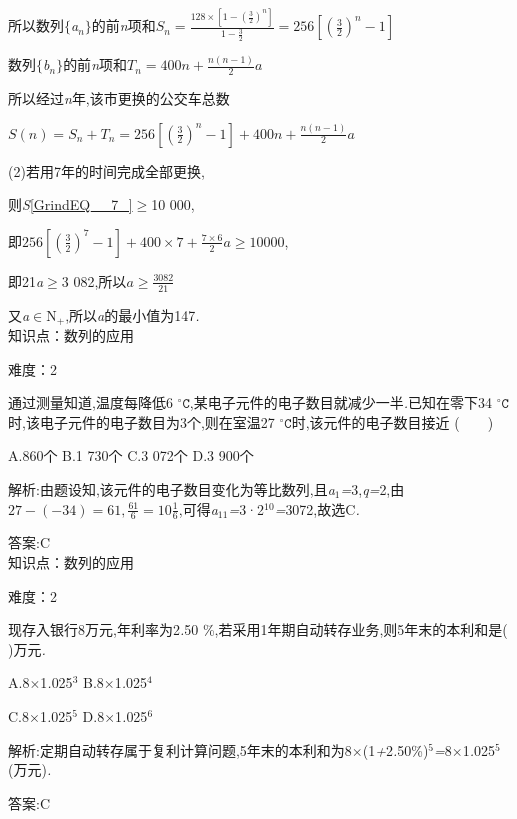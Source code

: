 \documentclass{article} %
\begin{document}
所以数列$\mathrm{\{}$\textit{a${}_{n}$}$\mathrm{\}}$的前\textit{n}项和$S_n=\frac{128\times [1-(\frac{3}{2})^n]}{1-\frac{3}{2}}=256[(\frac{3}{2})^n-1]$

数列$\mathrm{\{}$\textit{b${}_{n}$}$\mathrm{\}}$的前\textit{n}项和$T_n=400n+\frac{n(n-1)}{2}a$

所以经过\textit{n}年,该市更换的公交车总数

$S(n)=S_n+T_n=256[(\frac{3}{2})^n-1]+400n+\frac{n(n-1)}{2}a$

(2)若用7年的时间完成全部更换,

则\textit{S}\eqref{GrindEQ__7_}$\mathrm{\ge}$10 000,

即$256[(\frac{3}{2})^7-1]+400\times 7+\frac{7\times 6}{2}a\ge 10000$,

即21\textit{a}$\mathrm{\ge}$3 082,所以$a\ge \frac{3082}{21}$

又\textit{a}$\mathrm{\in}$N\textit{${}_{+}$},所以\textit{a}的最小值为147\textit{.} \\

知识点：数列的应用

难度：2

 通过测量知道,温度每降低6 $\mathtt{{}^\circ\!{C}}$,某电子元件的电子数目就减少一半\textit{.}已知在零下34 $\mathtt{{}^\circ\!{C}}$时,该电子元件的电子数目为3个,则在室温27 $\mathtt{{}^\circ\!{C}}$时,该元件的电子数目接近 (\textit{　　})

 A.860个 B.1 730个 C.3 072个 D.3 900个

 解析:由题设知,该元件的电子数目变化为等比数列,且\textit{a}${}_{1}$\textit{=}3,\textit{q=}2,由$27-(-34)=61,\frac{61}{6}=10\frac{1}{6}$,可得\textit{a}${}_{11}$\textit{=}3·2${}^{10}$\textit{=}3072,故选C\textit{.}

 答案:C \\

知识点：数列的应用

难度：2

 现存入银行8万元,年利率为2\textit{.}50 \%,若采用1年期自动转存业务,则5年末的本利和是(\textit{　　})万元\textit{.}

 A.8\textit{$\times$}1\textit{.}025${}^{3}$ B.8\textit{$\times$}1\textit{.}025${}^{4}$

 C.8\textit{$\times$}1\textit{.}025${}^{5}$ D.8\textit{$\times$}1\textit{.}025${}^{6}$

 解析:定期自动转存属于复利计算问题,5年末的本利和为8\textit{$\times$}(1\textit{+}2\textit{.}50\%)${}^{5}$\textit{=}8\textit{$\times$}1\textit{.}025${}^{5}$(万元)\textit{.}

 答案:C \\
\end{document}
